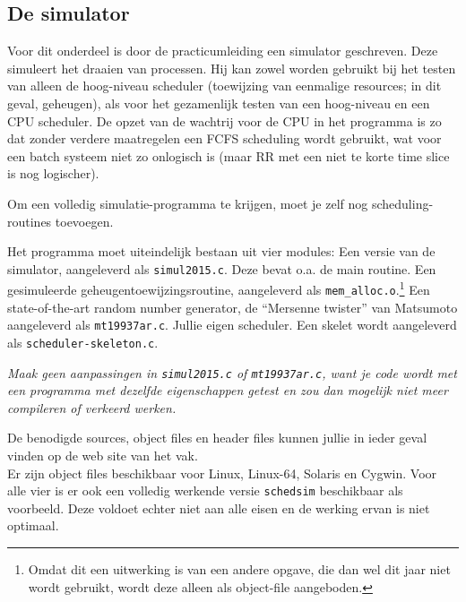 \documentclass[11pt,a4paper,twoside]{article}
\begin{document}
\subsection*{De simulator}


Voor dit onderdeel is door de practicumleiding een
simulator geschreven. Deze simuleert het
draaien van processen. Hij kan zowel worden gebruikt bij het testen van
alleen de hoog-niveau scheduler (toewijzing van eenmalige resources; in
dit geval, geheugen), als voor het gezamenlijk testen van een
hoog-niveau en een CPU scheduler. De opzet van de wachtrij voor de CPU
in het programma is zo dat zonder verdere maatregelen een FCFS
scheduling wordt gebruikt, wat voor een batch systeem niet zo onlogisch
is (maar RR met een niet te korte time slice is nog logischer).

Om een volledig simulatie-programma te krijgen, moet je zelf nog scheduling-routines toevoegen.

Het programma moet uiteindelijk bestaan uit vier modules:\newline
Een versie van de simulator, aangeleverd als \texttt{simul2015.c}.
Deze bevat o.a. de main routine.\newline
Een gesimuleerde geheugentoewijzingsroutine, aangeleverd als \texttt{mem\_alloc.o}.\footnote{Omdat dit een uitwerking is van een andere opgave, die dan wel dit jaar niet wordt gebruikt, wordt deze alleen als object-file aangeboden.} \newline
Een state-of-the-art random number generator, de ``Mersenne twister'' van
Matsumoto aangeleverd als \texttt{mt19937ar.c}.\newline
Jullie eigen scheduler. Een skelet wordt aangeleverd als \texttt{scheduler-skeleton.c}.\newline

\emph{Maak geen aanpassingen in \texttt{simul2015.c} of \texttt{mt19937ar.c}, want je code wordt met 
een programma met dezelfde eigenschappen getest en zou dan mogelijk niet meer compileren of verkeerd werken.}

De benodigde sources, object files en header files kunnen jullie in ieder geval vinden
op de web site van het vak.\\
Er zijn object files beschikbaar voor Linux, Linux-64, Solaris en Cygwin.\newline
Voor alle vier is er ook een volledig werkende versie \texttt{schedsim}
beschikbaar als voorbeeld. Deze voldoet echter niet aan alle eisen en de werking ervan is niet optimaal.
\end{document}
